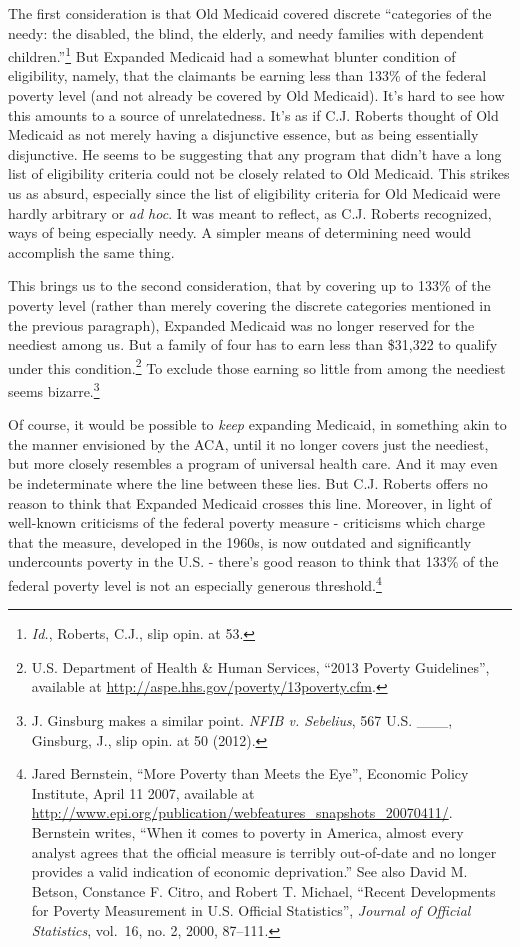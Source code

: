 \documentclass[
  11pt,
  letterpaper,
  DIV=11,
  numbers=noendperiod,
  twoside]{scrartcl}
\begin{document}
The first consideration is that Old Medicaid covered discrete
``categories of the needy: the disabled, the blind, the elderly, and
needy families with dependent children.''\footnote{\emph{Id.}, Roberts,
  C.J., slip opin. at 53.} But Expanded Medicaid had a somewhat blunter
condition of eligibility, namely, that the claimants be earning less
than 133\% of the federal poverty level (and not already be covered by
Old Medicaid). It's hard to see how this amounts to a source of
unrelatedness. It's as if C.J. Roberts thought of Old Medicaid as not
merely having a disjunctive essence, but as being essentially
disjunctive. He seems to be suggesting that any program that didn't have
a long list of eligibility criteria could not be closely related to Old
Medicaid. This strikes us as absurd, especially since the list of
eligibility criteria for Old Medicaid were hardly arbitrary or \emph{ad
hoc}. It was meant to reflect, as C.J. Roberts recognized, ways of being
especially needy. A simpler means of determining need would accomplish
the same thing.

This brings us to the second consideration, that by covering up to 133\%
of the poverty level (rather than merely covering the discrete
categories mentioned in the previous paragraph), Expanded Medicaid was
no longer reserved for the neediest among us. But a family of four has
to earn less than \$31,322 to qualify under this condition.\footnote{U.S.
  Department of Health \& Human Services, ``2013 Poverty Guidelines'',
  available at \url{http://aspe.hhs.gov/poverty/13poverty.cfm}.} To
exclude those earning so little from among the neediest seems
bizarre.\footnote{J. Ginsburg makes a similar point. \emph{NFIB v.
  Sebelius}, 567 U.S. \_\_\_, Ginsburg, J., slip opin. at 50 (2012).}

Of course, it would be possible to \emph{keep} expanding Medicaid, in
something akin to the manner envisioned by the ACA, until it no longer
covers just the neediest, but more closely resembles a program of
universal health care. And it may even be indeterminate where the line
between these lies. But C.J. Roberts offers no reason to think that
Expanded Medicaid crosses this line. Moreover, in light of well-known
criticisms of the federal poverty measure - criticisms which charge that
the measure, developed in the 1960s, is now outdated and significantly
undercounts poverty in the U.S. - there's good reason to think that
133\% of the federal poverty level is not an especially generous
threshold.\footnote{Jared Bernstein, ``More Poverty than Meets the
  Eye'', Economic Policy Institute, April 11 2007, available at
  \url{http://www.epi.org/publication/webfeatures_snapshots_20070411/}.
  Bernstein writes, ``When it comes to poverty in America, almost every
  analyst agrees that the official measure is terribly out-of-date and
  no longer provides a valid indication of economic deprivation.'' See
  also David M. Betson, Constance F. Citro, and Robert T. Michael,
  ``Recent Developments for Poverty Measurement in U.S. Official
  Statistics'', \emph{Journal of Official Statistics}, vol.~16, no. 2,
  2000, 87--111.}
\end{document}
